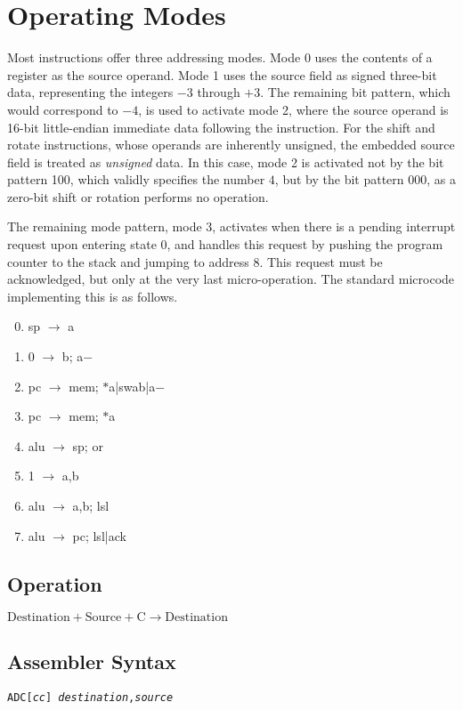 \documentclass[11pt]{book}
\newcommand*{\instruction}[2][]{%
  \clearpage
  \thispagestyle{fancy}%
  \fancyhf[HL,HR]{\huge{#2}}%
  \fancyhf[HC]{#1}\addtocounter{section}{1}\noindent
}
\begin{document}
\section{Operating Modes}
Most instructions offer three addressing modes.
Mode 0 uses the contents of a register as the source operand.
Mode 1 uses the source field as signed three-bit data,
representing the integers \(-3\) through \(+3\).
The remaining bit pattern, which would correspond to \(-4\),
is used to activate mode 2,
where the source operand is 16-bit little-endian immediate data
following the instruction.
For the shift and rotate instructions,
whose operands are inherently unsigned,
the embedded source field is treated as \emph{unsigned} data.
In this case, mode 2 is activated not by the bit pattern 100,
which validly specifies the number \(4\),
but by the bit pattern 000,
as a zero-bit shift or rotation performs no operation.

The remaining mode pattern, mode 3,
activates when there is a pending interrupt request
upon entering state 0,
and handles this request
by pushing the program counter to the stack
and jumping to address 8.
This request must be acknowledged,
but only at the very last micro-operation.
The standard microcode implementing this is as follows.

{\ttfamily\selectfont\small
  \begin{enumerate}\setcounter{enumi}{-1}
  \item sp \(\rightarrow\) a
  \item 0 \(\rightarrow\) b; a\(-\)
  \item pc \(\rightarrow\) mem; \(\ast\)a|swab|a\(-\)
  \item pc \(\rightarrow\) mem; \(\ast\)a
  \item alu \(\rightarrow\) sp; or
  \item 1 \(\rightarrow\) a,b
  \item alu \(\rightarrow\) a,b; lsl
  \item alu \(\rightarrow\) pc; lsl|ack
  \end{enumerate}
}


\instruction[Add With Carry]{ADC}
\subsection*{Operation}
\(\text{Destination}+\text{Source}+\text{C}
\rightarrow\text{Destination}\)

\subsection*{Assembler Syntax}
\texttt{ADC[\textit{cc}] \textit{destination},\textit{source}}
\end{document}
